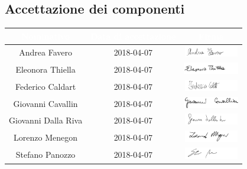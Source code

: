 \subsection{Accettazione dei componenti}
\begin{longtable}{| c | c | c |}
	\hline
	\rowcolor{bluSOS}
	\textcolor{white}{\textbf{Nominativo}} & \textcolor{white}{\textbf{Data di accettazione}} & \textcolor{white}{\textbf{Firma}}\\
	\hline
	Andrea Favero & 2018-04-07 & \includegraphics[height=0.5cm]{img/Firme/AndreaFavero.png} \\
	\hline
	Eleonora Thiella & 2018-04-07 & \includegraphics[height=0.5cm]{img/Firme/EleonoraThiella.png} \\
	\hline
	Federico Caldart & 2018-04-07 & \includegraphics[height=0.5cm]{img/Firme/FedericoCaldart.png} \\
	\hline
	Giovanni Cavallin & 2018-04-07 & \includegraphics[height=0.5cm]{img/Firme/GiovanniCavallin.png} \\
	\hline
	Giovanni Dalla Riva & 2018-04-07 & \includegraphics[height=0.5cm]{img/Firme/GiovanniDallaRiva.png} \\
	\hline
	Lorenzo Menegon & 2018-04-07 & \includegraphics[height=0.5cm]{img/Firme/LorenzoMenegon.png} \\
	\hline
	Stefano Panozzo & 2018-04-07 & \includegraphics[height=0.5cm]{img/Firme/StefanoPanozzo.png} \\
	\hline
\end{longtable}

